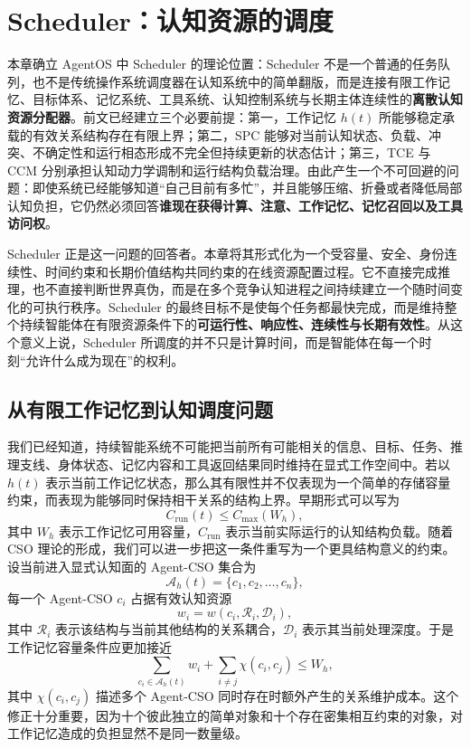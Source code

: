 \chapter{Scheduler：认知资源的调度}
\label{chap:scheduler}

\begin{chapterlead}
本章确立 AgentOS 中 Scheduler 的理论位置：Scheduler 不是一个普通的任务队列，也不是传统操作系统调度器在认知系统中的简单翻版，而是连接有限工作记忆、目标体系、记忆系统、工具系统、认知控制系统与长期主体连续性的\textbf{离散认知资源分配器}。前文已经建立三个必要前提：第一，工作记忆 $h(t)$ 所能够稳定承载的有效关系结构存在有限上界；第二，SPC 能够对当前认知状态、负载、冲突、不确定性和运行相态形成不完全但持续更新的状态估计；第三，TCE 与 CCM 分别承担认知动力学调制和运行结构负载治理。由此产生一个不可回避的问题：即使系统已经能够知道“自己目前有多忙”，并且能够压缩、折叠或者降低局部认知负担，它仍然必须回答\textbf{谁现在获得计算、注意、工作记忆、记忆召回以及工具访问权}。

Scheduler 正是这一问题的回答者。本章将其形式化为一个受容量、安全、身份连续性、时间约束和长期价值结构共同约束的在线资源配置过程。它不直接完成推理，也不直接判断世界真伪，而是在多个竞争认知进程之间持续建立一个随时间变化的可执行秩序。Scheduler 的最终目标不是使每个任务都最快完成，而是维持整个持续智能体在有限资源条件下的\textbf{可运行性、响应性、连续性与长期有效性}。从这个意义上说，Scheduler 所调度的并不只是计算时间，而是智能体在每一个时刻“允许什么成为现在”的权利。
\end{chapterlead}



\section{从有限工作记忆到认知调度问题}

我们已经知道，持续智能系统不可能把当前所有可能相关的信息、目标、任务、推理支线、身体状态、记忆内容和工具返回结果同时维持在显式工作空间中。若以 $h(t)$ 表示当前工作记忆状态，那么其有限性并不仅表现为一个简单的存储容量约束，而表现为能够同时保持相干关系的结构上界。早期形式可以写为
\[
C_{\mathrm{run}}(t)\leq C_{\max}(W_h),
\]
其中 $W_h$ 表示工作记忆可用容量，$C_{\mathrm{run}}$ 表示当前实际运行的认知结构负载。随着 CSO 理论的形成，我们可以进一步把这一条件重写为一个更具结构意义的约束。设当前进入显式认知面的 Agent-CSO 集合为
\[
\mathcal A_h(t)=\{c_1,c_2,\ldots,c_n\},
\]
每一个 Agent-CSO $c_i$ 占据有效认知资源
\[
w_i=w(c_i,\mathcal R_i,\mathcal D_i),
\]
其中 $\mathcal R_i$ 表示该结构与当前其他结构的关系耦合，$\mathcal D_i$ 表示其当前处理深度。于是工作记忆容量条件应更加接近
\[
\sum_{c_i\in\mathcal A_h(t)}w_i
+
\sum_{i\neq j}\chi(c_i,c_j)
\leq W_h,
\]
其中 $\chi(c_i,c_j)$ 描述多个 Agent-CSO 同时存在时额外产生的关系维护成本。这个修正十分重要，因为十个彼此独立的简单对象和十个存在密集相互约束的对象，对工作记忆造成的负担显然不是同一数量级。

